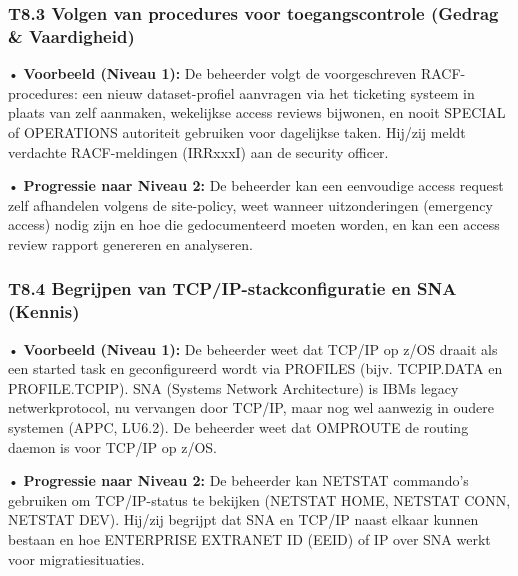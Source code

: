 \subsubsection{T8.3 Volgen van procedures voor toegangscontrole (Gedrag \& Vaardigheid)}

• \textbf{Voorbeeld (Niveau 1):} De beheerder volgt de voorgeschreven RACF-procedures: een nieuw dataset-profiel aanvragen via het ticketing systeem in plaats van zelf aanmaken, wekelijkse access reviews bijwonen, en nooit {SPECIAL} of {OPERATIONS} autoriteit gebruiken voor dagelijkse taken. Hij/zij meldt verdachte RACF-meldingen (IRRxxxI) aan de security officer.

• \textbf{Progressie naar Niveau 2:} De beheerder kan een eenvoudige access request zelf afhandelen volgens de site-policy, weet wanneer uitzonderingen (emergency access) nodig zijn en hoe die gedocumenteerd moeten worden, en kan een access review rapport genereren en analyseren.
\subsubsection{T8.4 Begrijpen van TCP/IP-stackconfiguratie en SNA (Kennis)}

• \textbf{Voorbeeld (Niveau 1):} De beheerder weet dat TCP/IP op z/OS draait als een started task en geconfigureerd wordt via PROFILES (bijv. {TCPIP.DATA} en {PROFILE.TCPIP}). {SNA} (Systems Network Architecture) is IBMs legacy netwerkprotocol, nu vervangen door TCP/IP, maar nog wel aanwezig in oudere systemen (APPC, LU6.2). De beheerder weet dat {OMPROUTE} de routing daemon is voor TCP/IP op z/OS.

• \textbf{Progressie naar Niveau 2:} De beheerder kan {NETSTAT} commando's gebruiken om TCP/IP-status te bekijken ({NETSTAT HOME}, {NETSTAT CONN}, {NETSTAT DEV}). Hij/zij begrijpt dat SNA en TCP/IP naast elkaar kunnen bestaan en hoe {ENTERPRISE EXTRANET ID} (EEID) of {IP} over SNA werkt voor migratiesituaties.
